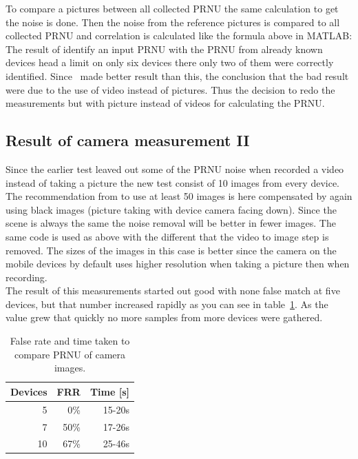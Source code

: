 To compare a pictures between all collected PRNU the same calculation to get the noise is done. Then the noise from the reference pictures is compared to all collected PRNU and correlation is calculated like the formula above in MATLAB:\\


The result of identify an input PRNU with the PRNU from already known devices head a limit on only six devices there only two of them were correctly identified. Since~\cite{sensor:camera:DCIdent} made better result than this, the conclusion that the bad result were due to the use of video instead of pictures. Thus the decision to redo the measurements but with picture instead of videos for calculating the PRNU. 

\subsection{Result of camera measurement II}
Since the earlier test leaved out some of the PRNU noise when recorded a video instead of taking a picture the new test consist of 10 images from every device. The recommendation from \cite{sensor:camera:DCIdent} to use at least 50 images is here compensated by again using black images (picture taking with device camera facing down). Since the scene is always the same the noise removal will be better in fewer images. The same code is used as above with the different that the video to image step is removed. The sizes of the images in this case is better since the camera on the mobile devices by default uses higher resolution when taking a picture then when recording. \\
The result of this measurements started out good with none false match at five devices, but that number increased rapidly as you can see in table~\ref{tab:falseCam}. As the value grew that quickly no more samples from more devices were gathered.

\begin{table}[htbp]
  \centering
    \begin{tabular}{rrr}
    \toprule
    Devices & FRR & Time [s] \\
    \midrule
    5     & 0\%   & 15-20s \\
    7     & 50\%  & 17-26s \\
    10    & 67\%  & 25-46s \\
    \bottomrule
    \end{tabular}%
    \caption{False rate and time taken to compare PRNU of camera images.}
  \label{tab:falseCam}%
\end{table}%


